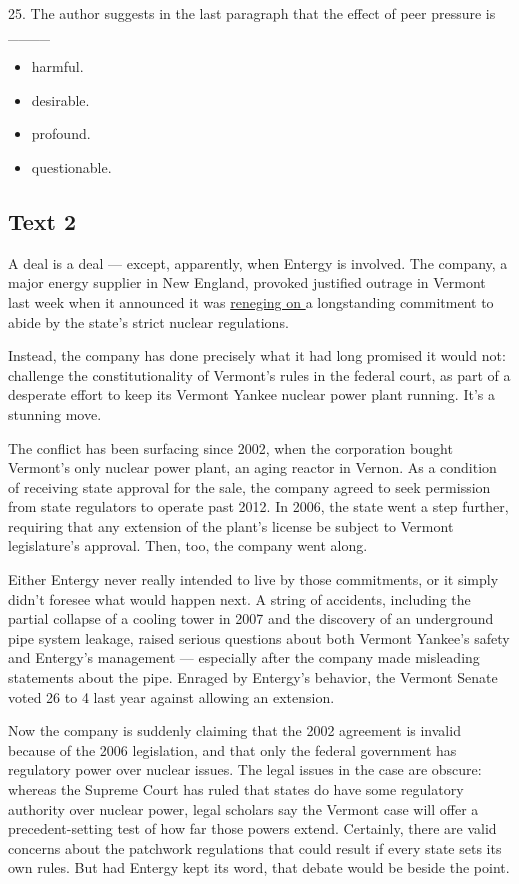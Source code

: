 \documentclass[UTF8,11pt]{ctexart}
\begin{document}
25. The author suggests in the last paragraph that the effect of peer pressure is \_\_\_\_


\begin{itemize}[leftmargin=2em,itemsep=.2em,topsep=.4em]\item[A.] harmful.
\item[B.] desirable.
\item[C.] profound.
\item[D.] questionable.
\end{itemize}

\subsection*{\textbf{Text 2}}


A deal is a deal — except, apparently, when Entergy is involved. The company, a major energy supplier in New England, provoked justified outrage in Vermont last week when it announced it was \uline{reneging on }a longstanding commitment to abide by the state’s strict nuclear regulations.


Instead, the company has done precisely what it had long promised it would not: challenge the constitutionality of Vermont’s rules in the federal court, as part of a desperate effort to keep its Vermont Yankee nuclear power plant running. It’s a stunning move.


The conflict has been surfacing since 2002, when the corporation bought Vermont’s only nuclear power plant, an aging reactor in Vernon. As a condition of receiving state approval for the sale, the company agreed to seek permission from state regulators to operate past 2012. In 2006, the state went a step further, requiring that any extension of the plant’s license be subject to Vermont legislature’s approval. Then, too, the company went along.


Either Entergy never really intended to live by those commitments, or it simply didn’t foresee what would happen next. A string of accidents, including the partial collapse of a cooling tower in 2007 and the discovery of an underground pipe system leakage, raised serious questions about both Vermont Yankee’s safety and Entergy’s management — especially after the company made misleading statements about the pipe. Enraged by Entergy’s behavior, the Vermont Senate voted 26 to 4 last year against allowing an extension.


Now the company is suddenly claiming that the 2002 agreement is invalid because of the 2006 legislation, and that only the federal government has regulatory power over nuclear issues. The legal issues in the case are obscure: whereas the Supreme Court has ruled that states do have some regulatory authority over nuclear power, legal scholars say the Vermont case will offer a precedent-setting test of how far those powers extend. Certainly, there are valid concerns about the patchwork regulations that could result if every state sets its own rules. But had Entergy kept its word, that debate would be beside the point.
\end{document}
